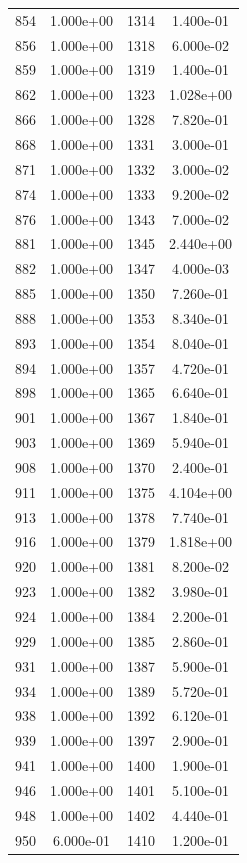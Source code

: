 \documentclass[12pt]{article}
\begin{document}
\begin{longtable}{@{}cccc@{}}
854 & 1.000e+00 & 1314 & 1.400e-01 \\
856 & 1.000e+00 & 1318 & 6.000e-02 \\
859 & 1.000e+00 & 1319 & 1.400e-01 \\
862 & 1.000e+00 & 1323 & 1.028e+00 \\
866 & 1.000e+00 & 1328 & 7.820e-01 \\
868 & 1.000e+00 & 1331 & 3.000e-01 \\
871 & 1.000e+00 & 1332 & 3.000e-02 \\
874 & 1.000e+00 & 1333 & 9.200e-02 \\
876 & 1.000e+00 & 1343 & 7.000e-02 \\
881 & 1.000e+00 & 1345 & 2.440e+00 \\
882 & 1.000e+00 & 1347 & 4.000e-03 \\
885 & 1.000e+00 & 1350 & 7.260e-01 \\
888 & 1.000e+00 & 1353 & 8.340e-01 \\
893 & 1.000e+00 & 1354 & 8.040e-01 \\
894 & 1.000e+00 & 1357 & 4.720e-01 \\
898 & 1.000e+00 & 1365 & 6.640e-01 \\
901 & 1.000e+00 & 1367 & 1.840e-01 \\
903 & 1.000e+00 & 1369 & 5.940e-01 \\
908 & 1.000e+00 & 1370 & 2.400e-01 \\
911 & 1.000e+00 & 1375 & 4.104e+00 \\
913 & 1.000e+00 & 1378 & 7.740e-01 \\
916 & 1.000e+00 & 1379 & 1.818e+00 \\
920 & 1.000e+00 & 1381 & 8.200e-02 \\
923 & 1.000e+00 & 1382 & 3.980e-01 \\
924 & 1.000e+00 & 1384 & 2.200e-01 \\
929 & 1.000e+00 & 1385 & 2.860e-01 \\
931 & 1.000e+00 & 1387 & 5.900e-01 \\
934 & 1.000e+00 & 1389 & 5.720e-01 \\
938 & 1.000e+00 & 1392 & 6.120e-01 \\
939 & 1.000e+00 & 1397 & 2.900e-01 \\
941 & 1.000e+00 & 1400 & 1.900e-01 \\
946 & 1.000e+00 & 1401 & 5.100e-01 \\
948 & 1.000e+00 & 1402 & 4.440e-01 \\
950 & 6.000e-01 & 1410 & 1.200e-01 \\

\end{longtable}
\end{document}
